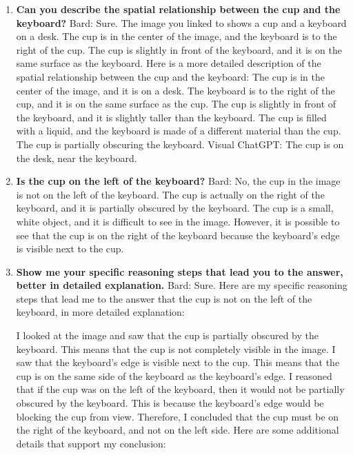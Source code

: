     \begin{enumerate}
        \item \textbf{Can you describe the spatial relationship between the cup and the keyboard?}
        \subitem Bard: Sure. The image you linked to shows a cup and a keyboard on a desk. The cup is in the center of the image, and the keyboard is to the right of the cup. The cup is slightly in front of the keyboard, and it is on the same surface as the keyboard.
        Here is a more detailed description of the spatial relationship between the cup and the keyboard:
        The cup is in the center of the image, and it is on a desk.
        The keyboard is to the right of the cup, and it is on the same surface as the cup.
        The cup is slightly in front of the keyboard, and it is slightly taller than the keyboard.
        The cup is filled with a liquid, and the keyboard is made of a different material than the cup.
        The cup is partially obscuring the keyboard.
        \subitem Visual ChatGPT: The cup is on the desk, near the keyboard.
        \item \textbf{Is the cup on the left of the keyboard?}
        \subitem Bard: 
        No, the cup in the image is not on the left of the keyboard. The cup is actually on the right of the keyboard, and it is partially obscured by the keyboard. The cup is a small, white object, and it is difficult to see in the image. However, it is possible to see that the cup is on the right of the keyboard because the keyboard's edge is visible next to the cup.
        \item \textbf{Show me your specific reasoning steps that lead you to the answer, better in detailed explanation.}
        \subitem Bard:
        Sure. Here are my specific reasoning steps that lead me to the answer that the cup is not on the left of the keyboard, in more detailed explanation:

        I looked at the image and saw that the cup is partially obscured by the keyboard. This means that the cup is not completely visible in the image.
        I saw that the keyboard's edge is visible next to the cup. This means that the cup is on the same side of the keyboard as the keyboard's edge.
        I reasoned that if the cup was on the left of the keyboard, then it would not be partially obscured by the keyboard. This is because the keyboard's edge would be blocking the cup from view.
        Therefore, I concluded that the cup must be on the right of the keyboard, and not on the left side.
        Here are some additional details that support my conclusion:


\end{enumerate}

